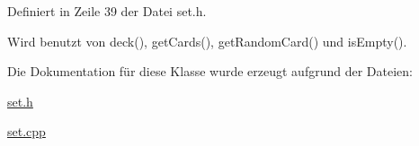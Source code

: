 Definiert in Zeile 39 der Datei set.\-h.



Wird benutzt von deck(), get\-Cards(), get\-Random\-Card() und is\-Empty().



Die Dokumentation für diese Klasse wurde erzeugt aufgrund der Dateien\-:\begin{DoxyCompactItemize}
\item 
\hyperlink{set_8h}{set.\-h}\item 
\hyperlink{set_8cpp}{set.\-cpp}\end{DoxyCompactItemize}
